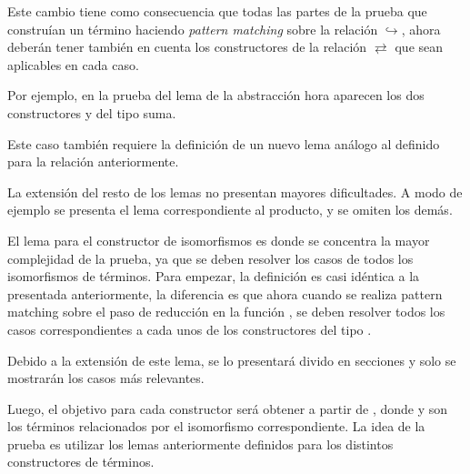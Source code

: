 Este cambio tiene como consecuencia que todas las partes de la prueba que construían un término \snstar haciendo \textit{pattern matching} sobre la relación $\hookrightarrow$, ahora deberán tener también en cuenta los constructores de la relación $\rightleftarrows$ que sean aplicables en cada caso.

\iffalse
Por ejemplo, en la prueba de \func{SN*-rename} ahora aparecen los dos constructores \const{inj₁} y \const{inj₂} del tipo suma.

\ExecuteMetaData[code/strong_norm.tex]{sn-rename}

Para esta prueba es necesario definir un nuevo lema análogo a \func{rename↪}.

\ExecuteMetaData[code/strong_norm.tex]{rename-iso-type}

Una modificación similar se realiza para extender el lema de la abstracción.
\fi

Por ejemplo, en la prueba del lema de la abstracción hora aparecen los dos constructores  y  del tipo suma.


Este caso también requiere la definición de un nuevo lema análogo al definido para la relación  anteriormente.


La extensión del resto de los lemas no presentan mayores dificultades.
A modo de ejemplo se presenta el lema correspondiente al producto, y se omiten los demás.


El lema para el constructor de isomorfismos es donde se concentra la mayor complejidad de la prueba, ya que se deben resolver los casos de todos los isomorfismos de términos.
Para empezar, la definición es casi idéntica a la presentada anteriormente, la diferencia es que ahora cuando se realiza pattern matching sobre el paso de reducción en la función , se deben resolver todos los casos correspondientes a cada unos de los constructores del tipo .

Debido a la extensión de este lema, se lo presentará divido en secciones y solo se mostrarán los casos más relevantes.


Luego, el objetivo para cada constructor será obtener \snstar{} a partir de \snstar{}, donde  y  son los términos relacionados por el isomorfismo correspondiente.
La idea de la prueba es utilizar los lemas anteriormente definidos para los distintos constructores de términos.

